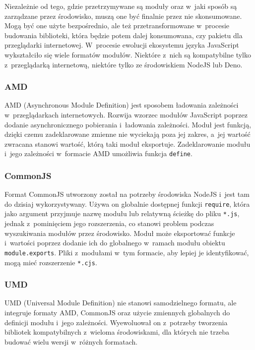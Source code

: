 Niezależnie od tego, gdzie przetrzymywane są moduły oraz w~jaki sposób są zarządzane przez środowisko, muszą one być finalnie przez nie skonsumowane. Mogą być one użyte bezpośrednio, ale też przetransformowane w~procesie budowania biblioteki, która będzie potem dalej konsumowana, czy pakietu dla przeglądarki internetowej. W~procesie ewolucji ekosystemu języka JavaScript wykształciło się wiele formatów modułów. Niektóre z~nich są kompatybilne tylko z~przeglądarką internetową, niektóre tylko ze środowiskiem NodeJS lub Deno.  

\subsubsection{AMD}

AMD (Asynchronous Module Definition) jest sposobem ładowania zależności w~przeglądarkach internetowych. Rozwija wzorzec modułów JavaScript \cite{jsmodulepattern} poprzez dodanie asynchronicznego pobierania i~ładowania zależności. Moduł jest funkcją, dzięki czemu zadeklarowane zmienne nie wyciekają poza jej zakres, a~jej wartość zwracana stanowi wartość, którą taki moduł eksportuje. Zadeklarowanie modułu i~jego zależności w~formacie AMD umożliwia funkcja \lstinline{define}.

\subsubsection{CommonJS}

Format CommonJS utworzony został na potrzeby środowiska NodeJS i~jest tam do dzisiaj wykorzystywany. Używa on globalnie dostępnej funkcji \lstinline{require}, która jako argument przyjmuje nazwę modułu lub relatywną ścieżkę do pliku \lstinline{*.js}, jednak z~pominięciem jego rozszerzenia, co stanowi problem podczas wyszukiwania modułów przez środowisko. Moduł może eksportować funkcje i~wartości poprzez dodanie ich do globalnego w~ramach modułu obiektu \lstinline{module.exports}. Pliki z~modułami w~tym formacie, aby lepiej je identyfikować, mogą mieć rozszerzenie \lstinline{*.cjs}.

\subsubsection{UMD}

UMD (Universal Module Definition) nie stanowi samodzielnego formatu, ale integruje formaty AMD, CommonJS oraz użycie zmiennych globalnych do definicji modułu i~jego zależności. Wyewoluował on z~potrzeby tworzenia bibliotek kompatybilnych z~wieloma środowiskami, dla których nie trzeba budować wielu wersji w~różnych formatach.

